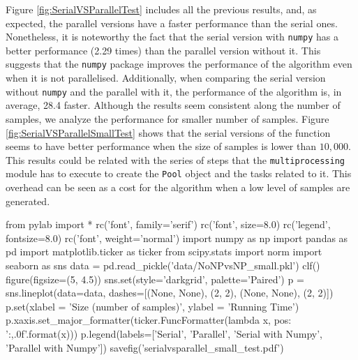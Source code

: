 \documentclass[11pt]{article}
\begin{document}
Figure \ref{fig:SerialVSParallelTest} includes all the previous results, and, as expected, the parallel versions have a
faster performance than the serial ones. Nonetheless, it is noteworthy the fact that the serial version with \texttt{numpy}
has a better performance (2.29 times) than the parallel version without it. This suggests that the \texttt{numpy} package
improves the performance of the algorithm even when it is not parallelised. Additionally, when comparing the serial version without
\texttt{numpy} and the parallel with it, the performance of the algorithm is, in average, 28.4 faster. Although the results
seem consistent along the number of samples, we analyze the performance for smaller number of samples. Figure \ref{fig:SerialVSParallelSmallTest}
shows that the serial versions of the function seems to have better performance when the size of samples is lower than
$10,000$. This results could be related with the series of steps that the \texttt{multiprocessing} module has to execute
to create the \texttt{Pool} object and the tasks related to it. This overhead can be seen as a cost for the algorithm when
a low level of samples are generated.

\begin{pycode}
from pylab import *
rc('font', family='serif')
rc('font', size=8.0)
rc('legend', fontsize=8.0)
rc('font', weight='normal')
import numpy as np
import pandas as pd
import matplotlib.ticker as ticker
from scipy.stats import norm
import seaborn as sns
data = pd.read_pickle('data/NoNPvsNP_small.pkl')
clf()
figure(figsize=(5, 4.5))
sns.set(style='darkgrid', palette='Paired')
p = sns.lineplot(data=data, dashes=[(None, None), (2, 2), (None, None), (2, 2)])
p.set(xlabel = 'Size (number of samples)', ylabel = 'Running Time')
p.xaxis.set_major_formatter(ticker.FuncFormatter(lambda x, pos: '{:,.0f}'.format(x)))
p.legend(labels=['Serial', 'Parallel', 'Serial with Numpy', 'Parallel with Numpy'])
savefig('serialvsparallel_small_test.pdf')
\end{pycode}
\end{document}
